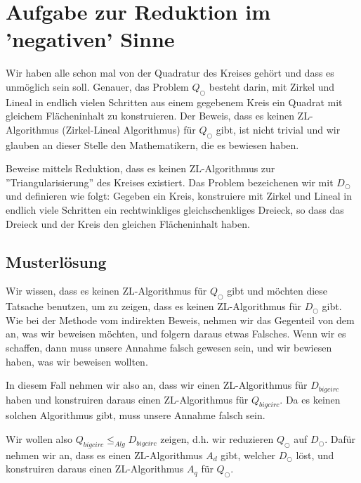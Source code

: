 \documentclass[
	12pt, %
	german, %
]{fphw}
\begin{document}

\section*{Aufgabe zur Reduktion im 'negativen' Sinne}

\begin{problem}
Wir haben alle schon mal von der Quadratur des Kreises gehört und dass es unmöglich sein soll. Genauer, das Problem \(Q_{\bigcirc}\) besteht darin, mit Zirkel und Lineal in endlich vielen Schritten aus einem gegebenem Kreis ein Quadrat mit gleichem Flächeninhalt zu konstruieren. Der Beweis, dass es keinen ZL-Algorithmus (Zirkel-Lineal Algorithmus) für \(Q_{\bigcirc}\) gibt, ist nicht trivial und wir glauben an dieser Stelle den Mathematikern, die es bewiesen haben.

Beweise mittels Reduktion, dass es keinen ZL-Algorithmus zur ''Triangularisierung'' des Kreises existiert. Das Problem bezeichenen wir mit \(D_{\bigcirc}\) und definieren wie folgt: Gegeben ein Kreis, konstruiere mit Zirkel und Lineal in endlich viele Schritten ein rechtwinkliges gleichschenkliges Dreieck, so dass das Dreieck und der Kreis den gleichen Flächeninhalt haben.
\end{problem}


\subsection*{Musterlösung}

Wir wissen, dass es keinen ZL-Algorithmus für \(Q_{\bigcirc}\) gibt und möchten diese Tatsache benutzen, um zu zeigen, dass es keinen ZL-Algorithmus für \(D_{\bigcirc}\) gibt. Wie bei der Methode vom indirekten Beweis, nehmen wir das Gegenteil von dem an, was wir beweisen möchten, und folgern daraus etwas Falsches. Wenn wir es schaffen, dann muss unsere Annahme falsch gewesen sein, und wir bewiesen haben, was wir beweisen wollten.

In diesem Fall nehmen wir also an, dass wir einen ZL-Algorithmus für \(D_{bigcirc}\) haben und konstruiren daraus einen ZL-Algorithmus für \(Q_{bigcirc}\). Da es keinen solchen Algorithmus gibt, muss unsere Annahme falsch sein.

Wir wollen also \(Q_{bigcirc} \leq_{Alg} D_{bigcirc}\) zeigen, d.h. wir reduzieren \(Q_{\bigcirc}\) auf \(D_{\bigcirc}\). Dafür nehmen wir an, dass es einen ZL-Algorithmus \(A_d\) gibt, welcher \(D_{\bigcirc}\) löst, und konstruiren daraus einen ZL-Algorithmus \(A_q\) für \(Q_{\bigcirc}\).
\end{document}
